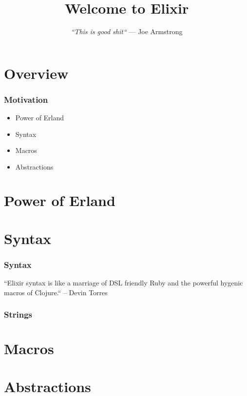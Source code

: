 \documentclass{beamer}
\begin{document}
\title{Welcome to Elixir}
\subtitle{
  \textit{
    \linebreak
    ``This is good shit``
    \linebreak
  }
  \tiny{\textrm{--- Joe Armstrong}}
}
\frame{\titlepage}


\section[Section]{Overview}

\begin{frame}
  \frametitle{Motivation}
  \begin{itemize}
  \item Power of Erland
  \item Syntax
  \item Macros
  \item Abstractions
  \end{itemize}
\end{frame}

\section[Section]{Power of Erland}

\section[Section]{Syntax}

\begin{frame}
  \frametitle{Syntax}
  ``Elixir syntax is like a marriage of DSL
  friendly Ruby and the powerful hygenic macros of Clojure.``
  \linebreak
  \textrm{-- Devin Torres}
\end{frame}

\begin{frame}
  \frametitle{Strings}
\end{frame}

\section[Section]{Macros}

\section[Section]{Abstractions}
  
\end{document}
